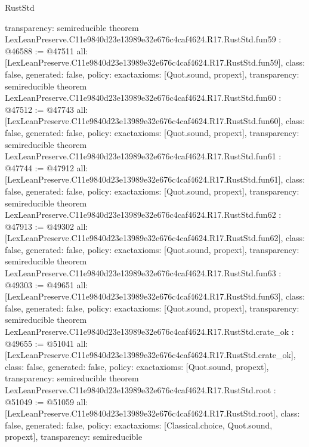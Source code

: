 \begin{lexlean}{RustStd}
\begin{coremodule}
{  transparency: semireducible
}
theorem LexLeanPreserve.C11e9840d23e13989e32e676c4caf4624.R17.RustStd.fun59 : @46588 := @47511 {
  all: [LexLeanPreserve.C11e9840d23e13989e32e676c4caf4624.R17.RustStd.fun59],
  class: false,
  generated: false,
  policy: exact{axioms: [Quot.sound, propext]},
  transparency: semireducible
}
theorem LexLeanPreserve.C11e9840d23e13989e32e676c4caf4624.R17.RustStd.fun60 : @47512 := @47743 {
  all: [LexLeanPreserve.C11e9840d23e13989e32e676c4caf4624.R17.RustStd.fun60],
  class: false,
  generated: false,
  policy: exact{axioms: [Quot.sound, propext]},
  transparency: semireducible
}
theorem LexLeanPreserve.C11e9840d23e13989e32e676c4caf4624.R17.RustStd.fun61 : @47744 := @47912 {
  all: [LexLeanPreserve.C11e9840d23e13989e32e676c4caf4624.R17.RustStd.fun61],
  class: false,
  generated: false,
  policy: exact{axioms: [Quot.sound, propext]},
  transparency: semireducible
}
theorem LexLeanPreserve.C11e9840d23e13989e32e676c4caf4624.R17.RustStd.fun62 : @47913 := @49302 {
  all: [LexLeanPreserve.C11e9840d23e13989e32e676c4caf4624.R17.RustStd.fun62],
  class: false,
  generated: false,
  policy: exact{axioms: [Quot.sound, propext]},
  transparency: semireducible
}
theorem LexLeanPreserve.C11e9840d23e13989e32e676c4caf4624.R17.RustStd.fun63 : @49303 := @49651 {
  all: [LexLeanPreserve.C11e9840d23e13989e32e676c4caf4624.R17.RustStd.fun63],
  class: false,
  generated: false,
  policy: exact{axioms: [Quot.sound, propext]},
  transparency: semireducible
}
theorem LexLeanPreserve.C11e9840d23e13989e32e676c4caf4624.R17.RustStd.crate_ok : @49655 := @51041 {
  all: [LexLeanPreserve.C11e9840d23e13989e32e676c4caf4624.R17.RustStd.crate_ok],
  class: false,
  generated: false,
  policy: exact{axioms: [Quot.sound, propext]},
  transparency: semireducible
}
theorem LexLeanPreserve.C11e9840d23e13989e32e676c4caf4624.R17.RustStd.root : @51049 := @51059 {
  all: [LexLeanPreserve.C11e9840d23e13989e32e676c4caf4624.R17.RustStd.root],
  class: false,
  generated: false,
  policy: exact{axioms: [Classical.choice, Quot.sound, propext]},
  transparency: semireducible
}


\end{coremodule}
\end{lexlean}
